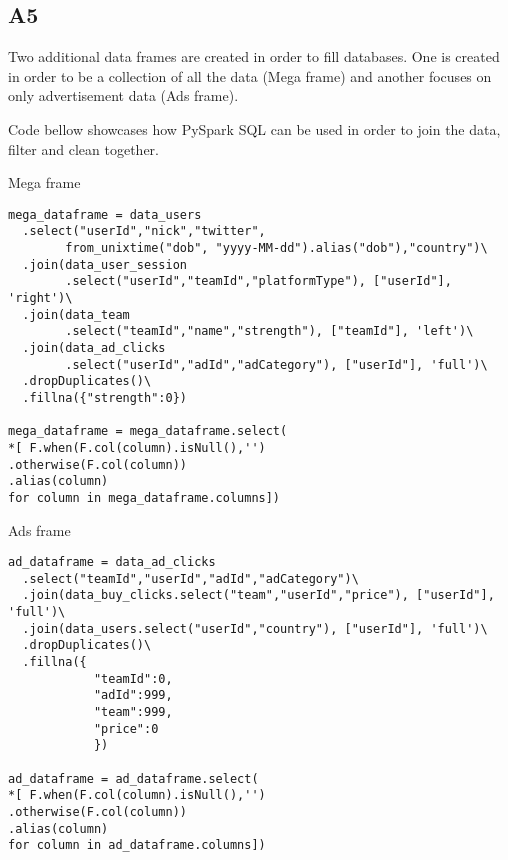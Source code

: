 \subsection{A5}\label{A5}

Two additional data frames are created in order to fill databases. One is created in order to be a collection of all the data (Mega frame) and another focuses on only advertisement data (Ads frame).

Code bellow showcases how PySpark SQL can be used in order to join the data, filter and clean together.

\begin{listing}[H]
\caption{Mega frame}
\begin{verbatim}
mega_dataframe = data_users
  .select("userId","nick","twitter", 
        from_unixtime("dob", "yyyy-MM-dd").alias("dob"),"country")\
  .join(data_user_session
        .select("userId","teamId","platformType"), ["userId"], 'right')\
  .join(data_team
        .select("teamId","name","strength"), ["teamId"], 'left')\
  .join(data_ad_clicks
        .select("userId","adId","adCategory"), ["userId"], 'full')\
  .dropDuplicates()\
  .fillna({"strength":0})
                
mega_dataframe = mega_dataframe.select( 
*[ F.when(F.col(column).isNull(),'')
.otherwise(F.col(column))
.alias(column) 
for column in mega_dataframe.columns])  
\end{verbatim}
\end{listing}

\begin{listing}[H]
\caption{Ads frame}
\begin{verbatim}
ad_dataframe = data_ad_clicks
  .select("teamId","userId","adId","adCategory")\
  .join(data_buy_clicks.select("team","userId","price"), ["userId"], 'full')\
  .join(data_users.select("userId","country"), ["userId"], 'full')\
  .dropDuplicates()\
  .fillna({
            "teamId":0,
            "adId":999,
            "team":999,
            "price":0
            })
                
ad_dataframe = ad_dataframe.select( 
*[ F.when(F.col(column).isNull(),'')
.otherwise(F.col(column))
.alias(column) 
for column in ad_dataframe.columns])                
\end{verbatim}
\end{listing}